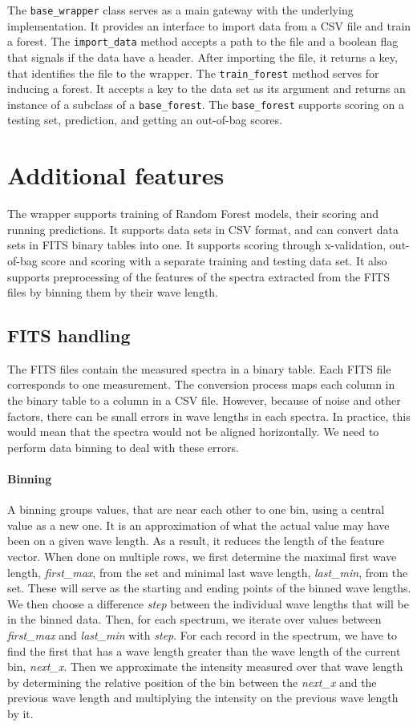 \documentclass[thesis=B,english]{FITthesis}[2012/10/20]
\begin{document}
The \texttt{base\_wrapper} class serves as a main gateway with the underlying implementation. It provides an interface to import data from a CSV file and train a forest. The \texttt{import\_data} method accepts a path to the file and a boolean flag that signals if the data have a header. After importing the file, it returns a key, that identifies the file to the wrapper. The \texttt{train\_forest} method serves for inducing a forest. It accepts a key to the data set as its argument and returns an instance of a subclass of a \texttt{base\_forest}. The \texttt{base\_forest} supports scoring on a testing set, prediction, and getting an out-of-bag scores. 

\section{Additional features}
The wrapper supports training of Random Forest models, their scoring and running predictions. It supports data sets in CSV format, and can convert data sets in FITS binary tables into one. It supports scoring through x-validation, out-of-bag score and scoring with a separate training and testing data set. It also supports preprocessing of the features of the spectra extracted from the FITS files by binning them by their wave length.

\subsection{FITS handling}
The FITS files contain the measured spectra in a binary table. Each FITS file corresponds to one measurement. The conversion process maps each column in the binary table to a column in a CSV file. However, because of noise and other factors, there can be small errors in wave lengths in each spectra. In practice, this would mean that the spectra would not be aligned horizontally. We need to perform data binning to deal with these errors. 

\paragraph*{Binning}
\label{sec:binning} 
A binning groups values, that are near each other to one bin, using a central value as a new one. It is an approximation of what the actual value may have been on a given wave length. As a result, it reduces the length of the feature vector. When done on multiple rows, we first determine the maximal first wave length, \textit{first\_max}, from the set and minimal last wave length, \textit{last\_min}, from the set. These will serve as the starting and ending points of the binned wave lengths. We then choose a difference \textit{step} between the individual wave lengths that will be in the binned data. Then, for each spectrum, we iterate over values between \textit{first\_max} and \textit{last\_min} with \textit{step}. For each record in the spectrum, we have to find the first that has a wave length greater than the wave length of the current bin, \textit{next\_x}. Then we approximate the intensity measured over that wave length by determining the relative position of the bin between the \textit{next\_x} and the previous wave length and multiplying the intensity on the previous wave length by it. 
\end{document}
